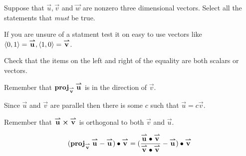 \documentclass{ximera}
\author{Jim Talamo}
\begin{document}
\begin{exercise}
Suppose that $\vec u , \vec v $ and $\vec w $ are nonzero three dimensional vectors. Select all the statements that \emph{must} be true.

\begin{selectAll}
\end{selectAll}

\begin{hint}
If you are unsure of a statment test it on easy to use vectors like $\vector{ 0,1 } =\vec u , \vector{ 1,0 } = \vec v$.
\end{hint}

\begin{hint}
Check that the items on the left and right of the equality are both
scalars or vectors.
\end{hint}

\begin{hint}
Remember that $\proj_{\vec v} \vec u$ is in the direction of $\vec v$.
\end{hint}

\begin{hint}
Since $\vec u$ and $\vec v$ are parallel then there is some $c$ such that $\vec u = c \vec v$.
\end{hint}

\begin{hint}
Remember that $\vec u \cross \vec v$ is orthogonal to both $\vec v$ and $\vec u$.
\end{hint}

\begin{hint}
\[
(\proj_{\vec v} \vec u -\vec u) \dotp \vec v = (\frac {\vec u \dotp \vec v} {\vec v\dotp \vec v} -\vec u) \dotp \vec v
\]
\end{hint}
\end{exercise}
\end{document}
